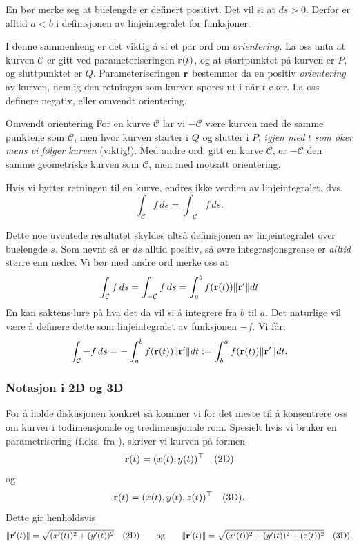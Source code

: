 \begin{rem}{}
En bør merke seg at buelengde er definert positivt. Det vil si at $ds>0.$ Derfor er alltid $a<b$ i definisjonen av linjeintegralet for funksjoner.
\end{rem}
I denne sammenheng er det viktig å si et par ord om \textit{orientering.}
La oss anta at kurven \( \mathcal{C} \) er gitt ved parameteriseringen $\mathbf{r}(t)$, og at startpunktet på kurven er \( P \), og sluttpunktet er \( Q \).
Parameteriseringen \( \mathbf{r} \) bestemmer da en positiv \emph{orientering} av kurven, nemlig den retningen som kurven spores ut i når \( t \) øker.
La oss definere negativ, eller omvendt orientering.
\begin{defn}{Omvendt orientering}
\label{omvendt_orient}
For en kurve $\mathcal{C}$ lar vi \( -\mathcal{C} \) være kurven med de samme punktene som \( \mathcal{C} \), men hvor kurven starter i \( Q \) og slutter i \( P \), \textit{igjen med} \( t \) \textit{som øker mens vi følger kurven} (viktig!). Med andre ord: gitt en kurve \( \mathcal{C} \), er \( -\mathcal{C} \) den samme geometriske kurven som \( \mathcal{C} \), men med motsatt orientering. 
\end{defn}
Hvis vi bytter retningen til en kurve, endres ikke verdien av linjeintegralet, dvs.
\[ \int_\mathcal{C} f\, ds = \int_{-\mathcal{C}} f\, ds.\]
\begin{rem}{}
Dette noe uventede resultatet skyldes altså definisjonen av linjeintegralet over buelengde $s$. Som nevnt så er $ds$ alltid positiv, så øvre integrasjonsgrense er \textit{alltid} større enn nedre. Vi bør med andre ord merke oss at 
\[\int_\mathcal{C} f\, ds=\int_{-\mathcal{C}} f\, ds=\int_a^bf(\mathbf{r}(t))\|\mathbf{r}^\prime\|dt\]
En kan saktens lure på hva det da vil si å integrere fra $b$ til $a.$ Det naturlige vil være å definere dette som linjeintegralet av funksjonen $-f$. Vi får:
\[\int_\mathcal{C} -f\, ds=-\int_a^bf(\mathbf{r}(t))\|\mathbf{r}^\prime\|dt:=\int_b^af(\mathbf{r}(t))\|\mathbf{r}^\prime\|dt.\]
\end{rem}

\subsubsection{Notasjon i 2D og 3D}
For å holde diskusjonen konkret så kommer vi for det meste til å konsentrere oss om kurver i todimensjonale og tredimensjonale rom. Spesielt hvis vi bruker en parametrisering (f.eks. fra ), skriver vi kurven på formen \[\mathbf{r}(t) = (x(t),y(t))^\top\quad\textrm{(2D)}\] og \[\mathbf{r}(t) = (x(t),y(t),z(t))^\top\quad\textrm{(3D)}.\] Dette gir henholdsvis  
\[\lVert \mathbf{r}'(t)\rVert = \sqrt{(x'(t))^2+(y'(t))^2}\quad\text{(2D)}\qquad\textrm{og}\qquad\lVert \mathbf{r}'(t)\rVert = \sqrt{(x'(t))^2+(y'(t))^2+(z(t))^2}\quad\text{(3D)}.\]

